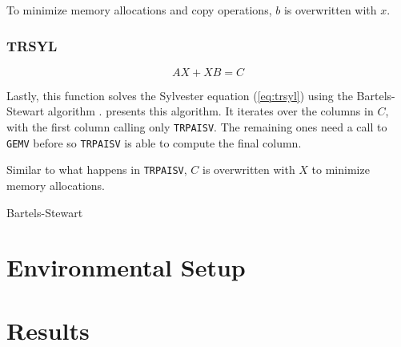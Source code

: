 \documentclass[../thesis]{subfiles}
\begin{document}
		To minimize memory allocations and copy operations, $b$ is overwritten with $x$.

		\subsubsection{TRSYL}
		\begin{equation}
			AX + XB = C
			\label{eq:trsyl}
		\end{equation}

		Lastly, this function solves the Sylvester equation (\cref{eq:trsyl}) using the Bartels-Stewart algorithm \cite[367-368]{Golub:Loan:MC:1996}.  presents this algorithm. It iterates over the columns in $C$, with the first column calling only \texttt{TRPAISV}. The remaining ones need a call to \texttt{GEMV} before so \texttt{TRPAISV} is able to compute the final column.

		Similar to what happens in \texttt{TRPAISV}, $C$ is overwritten with $X$ to minimize memory allocations.

		\begin{algorithm}[htp]
			\caption{Bartels-Stewart}
			\label{alg:bartel_stewart}
			\DontPrintSemicolon



		\end{algorithm}

	\section{Environmental Setup}
	\section{Results}

	
\end{document}

